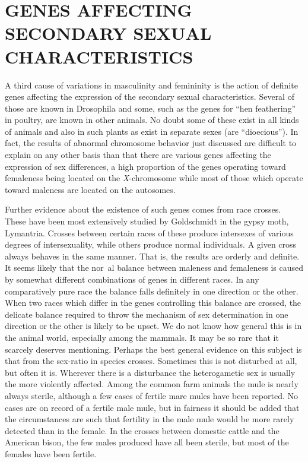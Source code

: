 \section*{GENES AFFECTING SECONDARY SEXUAL CHARACTERISTICS}

A third cause of variations in masculinity and femininity is the
action of definite genes affecting the expression of the secondary sexual
characteristics. Several of those are known in Drosophila and some,
such as the genes for ``hen feathering'' in poultry, are known in other
animals. No doubt some of these exist in all kinds of animals and also
in such plants as exist in separate sexes (are ``dioecious''). In fact, the
results of abnormal chromosome behavior just discussed are difficult to
explain on any other basis than that there are various genes affecting
the expression of sex differences, a high proportion of the genes operating
toward femaleness being located on the \textit{X}-chromosome while most
of those which operate toward maleness are located on the autosomes.

Further evidence about the existence of such genes comes from race
crosses. These have been most extensively studied by Goldschmidt in
the gypsy moth, Lymantria. Crosses between certain races of these produce
intersexes of various degrees of intersexuality, while others produce
normal individuals. A given cross always behaves in the same manner.
That is, the results are orderly and definite. It seems likely that the
nor~al balance between maleness and femaleness is caused by somewhat
different combinations of genes in different races. In any comparatively
pure race the balance falls definitely in one direction or the other.
When two races which differ in the genes controlling this balance are
crossed, the delicate balance required to throw the mechanism of sex
determination in one direction or the other is likely to be upset. We do
not know how general this is in the animal world, especially among the
mammals. It may be so rare that it scarcely deserves mentioning. Perhaps
the best general evidence on this subject is that from the sex-ratio
in species crosses. Sometimes this is not disturbed at all, but often it is.
Wherever there is a disturbance the heterogametic sex is usually the
more violently affected. Among the common farm animals the mule is
nearly always sterile, although a few cases of fertile mare mules have
been reported. No cases are on record of a fertile male mule, but in fairness
it should be added that the circumstances are such that fertility in
the male mule would be more rarely detected than in the female. In the
crosses between domestic cattle and the American bison, the few males
produced have all been sterile, but most of the females have been
fertile.

